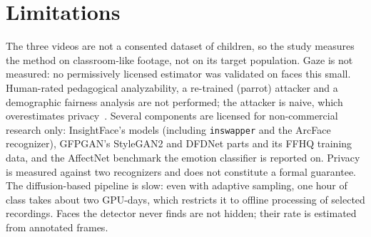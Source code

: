 
\section{Limitations}

The three videos are not a consented dataset of children, so the study measures
the method on classroom-like footage, not on its target population. Gaze is not
measured: no permissively licensed estimator was validated on faces this small.
Human-rated pedagogical analyzability, a re-trained (parrot) attacker and a
demographic fairness analysis are not performed; the attacker is naive, which
overestimates privacy~\cite{hanisch}. Several components are licensed for
non-commercial research only: InsightFace's models (including \texttt{inswapper}
and the ArcFace recognizer), GFPGAN's StyleGAN2 and DFDNet parts and its FFHQ
training data, and the AffectNet benchmark the emotion classifier is reported on.
Privacy is measured against two recognizers and does not constitute a formal
guarantee.
The diffusion-based pipeline is slow: even with adaptive sampling, one hour of
class takes about two GPU-days, which restricts it to offline processing of
selected recordings. Faces the detector never finds
are not hidden; their rate is estimated from annotated frames.

